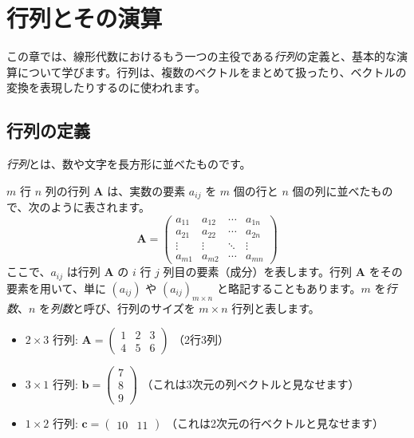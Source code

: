 \section{行列とその演算} \setcounter{ex}{0}

この章では、線形代数におけるもう一つの主役である\emph{行列}の定義と、基本的な演算について学びます。行列は、複数のベクトルをまとめて扱ったり、ベクトルの変換を表現したりするのに使われます。

\subsection{行列の定義}

\emph{行列}とは、数や文字を長方形に並べたものです。

\begin{dfn}[行列] \label{matrix}
$m$ 行 $n$ 列の行列 $\bm{A}$ は、実数の要素 $a_{ij}$ を $m$ 個の行と $n$ 個の列に並べたもので、次のように表されます。
\[
\bm{A} = \begin{pmatrix}
a_{11} & a_{12} & \cdots & a_{1n} \\
a_{21} & a_{22} & \cdots & a_{2n} \\
\vdots & \vdots & \ddots & \vdots \\
a_{m1} & a_{m2} & \cdots & a_{mn}
\end{pmatrix}
\]
ここで、$a_{ij}$ は行列 $\bm{A}$ の $i$ 行 $j$ 列目の要素（成分）を表します。行列 $\bm{A}$ をその要素を用いて、単に $(a_{ij})$ や $(a_{ij})_{m \times n}$ と略記することもあります。$m$ を\emph{行数}、$n$ を\emph{列数}と呼び、行列のサイズを $m \times n$ 行列と表します。
\end{dfn}

\begin{ex}
\begin{itemize}
\item $2 \times 3$ 行列: $\bm{A} = \begin{pmatrix} 1 & 2 & 3 \\ 4 & 5 & 6 \end{pmatrix}$ （2行3列）
\item $3 \times 1$ 行列: $\bm{b} = \begin{pmatrix} 7 \\ 8 \\ 9 \end{pmatrix}$ （これは3次元の列ベクトルと見なせます）
\item $1 \times 2$ 行列: $\bm{c} = \begin{pmatrix} 10 & 11 \end{pmatrix}$ （これは2次元の行ベクトルと見なせます）
\end{itemize}
\end{ex}

